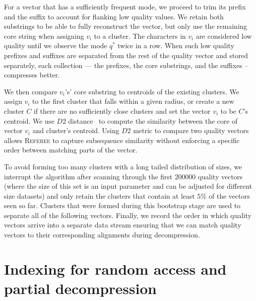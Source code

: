 \documentclass[12pt]{cmuthesis}
\newcommand{\refer}{\textsc{Referee}\xspace}
\begin{document}
  For a vector that has a sufficiently frequent mode, we proceed to trim its prefix and the suffix to account for flanking low quality values. We retain both substrings to be able to fully reconstruct the vector, but only use the remaining core string when assigning $v_i$ to a cluster. The characters in $v_i$ are considered low quality until we observe the mode $q^*$ twice in a row. When such low quality prefixes and suffixes are separated from the rest of the quality vector and stored separately, each collection --- the prefixes, the core substrings, and the suffixes -- compresses better.

  We then compare $v_i$'s' core substring to centroids of the existing clusters. We assign $v_i$ to the first cluster that falls within a given radius, or create a new cluster $C$ if there are no sufficiently close clusters and set the vector $v_i$ to be $C$'s centroid. We use $D2$ distance~\cite{D2Dist} to compute the similarity between the core of vector $v_i$ and cluster's centroid. Using $D2$ metric to compare two quality vectors allows \refer to capture subsequence similarity without enforcing a specific order between matching parts of the vector.

  To avoid forming too many clusters with a long tailed distribution of sizes, we interrupt the algorithm after scanning through the first $200000$ quality vectors (where the size of this set is an input parameter and can be adjusted for different size datasets) and only retain the clusters that contain at least $5\%$ of the vectors seen so far. Clusters that were formed during this bootstrap stage are used to separate all of the following vectors. Finally, we record the order in which quality vectors arrive into a separate data stream ensuring that we can match quality vectors to their corresponding alignments during decompression.

  \section{Indexing for random access and partial decompression}
  \label{sec:referee:random_access}
\end{document}
